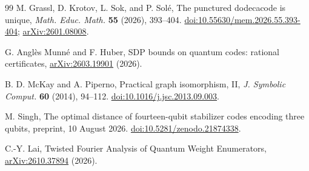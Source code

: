 \begin{thebibliography}{99}
M. Grassl, D. Krotov, L. Sok, and P. Sol\'e,
The punctured dodecacode is unique,
\emph{Math. Educ. Math.} \textbf{55} (2026), 393--404.
\href{https://doi.org/10.55630/mem.2026.55.393-404}{doi:10.55630/mem.2026.55.393-404};
\href{https://arxiv.org/abs/2601.08008}{arXiv:2601.08008}.

G. Angl\`es Munn\'e and F. Huber,
SDP bounds on quantum codes: rational certificates,
\href{https://arxiv.org/abs/2603.19901}{arXiv:2603.19901} (2026).

B. D. McKay and A. Piperno,
Practical graph isomorphism, II,
\emph{J. Symbolic Comput.} \textbf{60} (2014), 94--112.
\href{https://doi.org/10.1016/j.jsc.2013.09.003}{doi:10.1016/j.jsc.2013.09.003}.

M. Singh, The optimal distance of fourteen-qubit stabilizer codes encoding
three qubits, preprint, 10 August 2026.
\href{https://doi.org/10.5281/zenodo.21874338}{doi:10.5281/zenodo.21874338}.

C.-Y. Lai, Twisted Fourier Analysis of Quantum Weight Enumerators,
\href{https://arxiv.org/abs/2610.37894}{arXiv:2610.37894} (2026).

\end{thebibliography}
